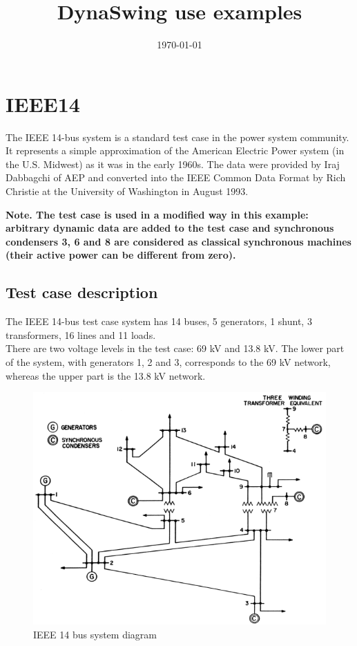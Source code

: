 \documentclass[a4paper, 12pt]{report}
\begin{document}
\title{DynaSwing use examples}
\date\today

\maketitle
\tableofcontents

\chapter{IEEE14}

The IEEE 14-bus system is a standard test case in the power system community. It represents a simple approximation of the American Electric Power system (in the U.S. Midwest) as it was in the early 1960s. The data were provided by Iraj Dabbagchi of AEP and converted into the IEEE Common Data Format by Rich Christie at the University of Washington in August 1993.

\textbf{Note. The test case is used in a modified way in this example: arbitrary dynamic data are added to the test case and synchronous condensers 3, 6 and 8 are considered as classical synchronous machines (their active power can be different from zero).}

\section{Test case description}

The IEEE 14-bus test case system has 14 buses, 5 generators, 1 shunt, 3 transformers, 16 lines and 11 loads.\\
There are two voltage levels in the test case: 69 kV and 13.8 kV. The lower part of the system, with generators 1, 2 and 3, corresponds to the 69 kV network, whereas the upper part is the 13.8 kV network.

\begin{figure}[H]
  \includegraphics[width=\textwidth]{Single-line-diagram-of-IEEE-14-bus-system.png}
  \caption{IEEE 14 bus system diagram}
\end{figure}
\end{document}
